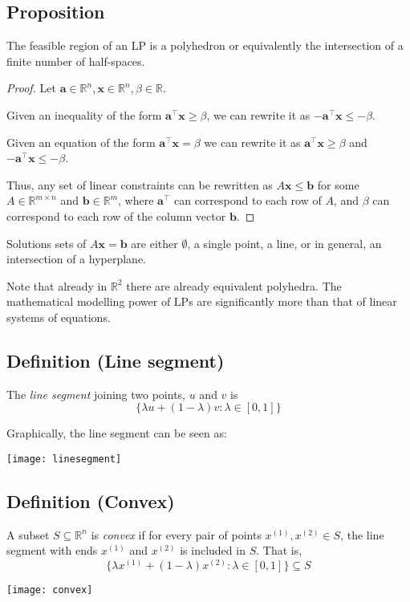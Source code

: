 \begin{thmbox}
    \subsection{Proposition}
    The feasible region of an LP is a polyhedron or equivalently the
    intersection of a finite number of half-spaces.
\end{thmbox}
\begin{proof}
    Let $ \bm{a}\in\mathbb{R}^n,\bm{x}\in\mathbb{R}^n,\beta\in \mathbb{R} $.

    Given an inequality of the form $ \bm{a} ^\top \bm{x}\ge \beta $, we can
    rewrite it as $ -\bm{a} ^\top \bm{x}\le -\beta $.

    Given an equation of the form $ \bm{a} ^\top \bm{x}=\beta $ we can rewrite it as
    $ \bm{a} ^\top \bm{x}\ge \beta $ and $ -\bm{a} ^\top \bm{x}\le -\beta $.

    Thus, any set of linear constraints can be rewritten as 
    $ A\bm{x}\le \bm{b} $ for some $ A\in \mathbb{R}^{m \times n} $ and $ \bm{b}\in \mathbb{R}^m $, where $ \bm{a}^\top $ can correspond to each row of $ A $,
    and $ \beta $ can correspond to each row of the column vector $ \bm{b} $.
\end{proof}

Solutions sets of $ A\bm{x}=\bm{b} $ are either $ \emptyset $, a single
point, a line, or in general, an intersection of a hyperplane.

Note that already in $ \mathbb{R}^2 $ there are already equivalent polyhedra.
The mathematical modelling power of LPs are significantly more than that of
linear systems of equations.

\begin{defbox}
    \subsection{Definition (Line segment)}
    The \emph{line segment} joining two points, $ u $ and $ v $ is
    \[ \{\lambda u + (1-\lambda)v:\lambda\in[0,1]\} \]
\end{defbox}
Graphically, the line segment can be seen as:
\begin{center}
    \texttt{[image: linesegment]}
\end{center}

\begin{defbox}
    \subsection{Definition (Convex)}
    A subset $ S\subseteq \mathbb{R}^n $ is \emph{convex} if for 
    every pair of points $ x^{(1)},x^{(2)}\in S $, the line segment with
    ends $ x^{(1)} $ and $ x^{(2)} $ is included in $ S $. That is,
    \[ \{\lambda x^{(1)} + (1-\lambda)x^{(2)}:\lambda\in[0,1]\}\subseteq S \]
    
\end{defbox}
\begin{center}
    \texttt{[image: convex]}
\end{center}


